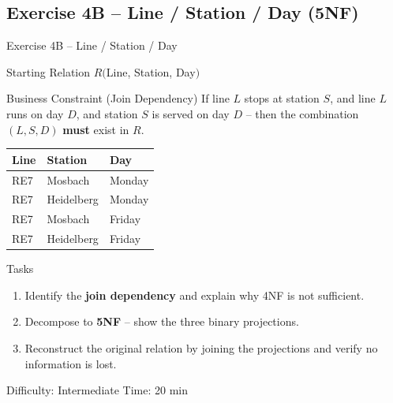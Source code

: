 \documentclass[10pt]{beamer}
\begin{document}
\subsection{Exercise 4B -- Line / Station / Day (5NF)}

\begin{frame}{Exercise 4B -- Line / Station / Day}
  \begin{block}{Starting Relation}
    $R($Line, Station, Day$)$
  \end{block}

  \begin{block}{Business Constraint (Join Dependency)}
    If line $L$ stops at station $S$, and line $L$ runs on day $D$, and station $S$ is served on day $D$ -- then the combination $(L, S, D)$ \textbf{must} exist in $R$.
  \end{block}

  \small
  \begin{tabular}{|l|l|l|}
    \hline
    \textbf{Line} & \textbf{Station} & \textbf{Day} \\
    \hline
    RE7 & Mosbach & Monday \\
    RE7 & Heidelberg & Monday \\
    RE7 & Mosbach & Friday \\
    RE7 & Heidelberg & Friday \\
    \hline
  \end{tabular}

  \vspace{6pt}
  \begin{block}{Tasks}
    \begin{enumerate}
      \item Identify the \textbf{join dependency} and explain why 4NF is not sufficient.
      \item Decompose to \textbf{5NF} -- show the three binary projections.
      \item Reconstruct the original relation by joining the projections and verify no information is lost.
    \end{enumerate}
  \end{block}

  \begin{alertblock}{Difficulty: Intermediate \quad Time: 20 min}
  \end{alertblock}
\end{frame}

\end{document}

